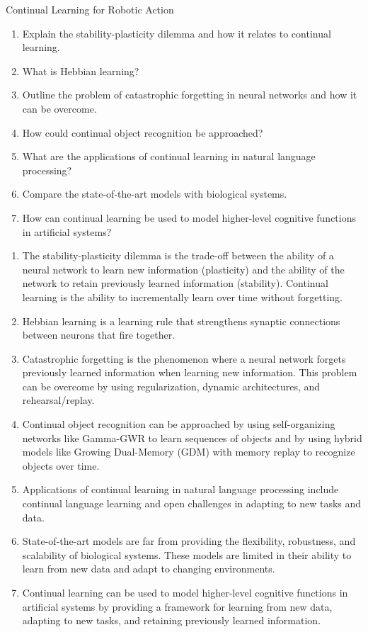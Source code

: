 \documentclass{article}
\begin{document}
\begin{exercise}{Continual Learning for Robotic Action}
  \begin{enumerate}
    \item Explain the stability-plasticity dilemma and how it relates to continual learning.
    \item What is Hebbian learning?
    \item Outline the problem of catastrophic forgetting in neural networks and how it can be overcome.
    \item How could continual object recognition be approached?
    \item What are the applications of continual learning in natural language processing?
    \item Compare the state-of-the-art models with biological systems.
    \item How can continual learning be used to model higher-level cognitive functions in artificial systems?
  \end{enumerate}

  \begin{solution}
    \begin{enumerate}
      \item The stability-plasticity dilemma is the trade-off between the ability of a neural network to learn new information (plasticity) and the ability of the network to retain previously learned information (stability). Continual learning is the ability to incrementally learn over time without forgetting.
      \item Hebbian learning is a learning rule that strengthens synaptic connections between neurons that fire together.
      \item Catastrophic forgetting is the phenomenon where a neural network forgets previously learned information when learning new information. This problem can be overcome by using regularization, dynamic architectures, and rehearsal/replay.
      \item Continual object recognition can be approached by using self-organizing networks like Gamma-GWR to learn sequences of objects and by using hybrid models like Growing Dual-Memory (GDM) with memory replay to recognize objects over time.
      \item Applications of continual learning in natural language processing include continual language learning and open challenges in adapting to new tasks and data.
      \item State-of-the-art models are far from providing the flexibility, robustness, and scalability of biological systems. These models are limited in their ability to learn from new data and adapt to changing environments.
      \item Continual learning can be used to model higher-level cognitive functions in artificial systems by providing a framework for learning from new data, adapting to new tasks, and retaining previously learned information.
    \end{enumerate}
  \end{solution}
\end{exercise}
\end{document}
